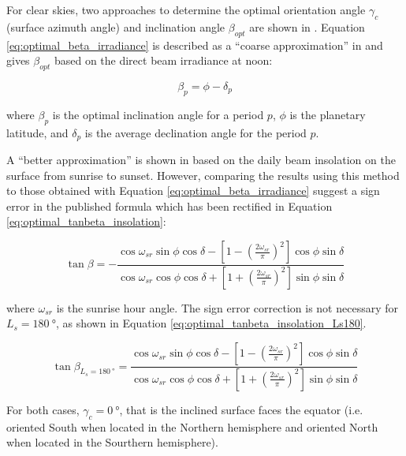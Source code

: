 For clear skies, two approaches to determine the optimal orientation angle $\gamma_{c}$ (surface azimuth angle) and inclination angle $\beta_{opt}$ are shown in . Equation \ref{eq:optimal_beta_irradiance} is described as a ``coarse approximation'' in  and gives $\beta_{opt}$ based on the direct beam irradiance at noon:

\begin{equation}
  \label{eq:optimal_beta_irradiance}
  \beta_{p} = \phi - \delta_{p}
\end{equation}

where $\beta_{p}$ is the optimal inclination angle for a period $p$, $\phi$ is the planetary latitude, and $\delta_{p}$ is the average declination angle for the period $p$.

A ``better approximation'' is shown in  based on the daily beam insolation on the surface from sunrise to sunset. However, comparing the results using this method to those obtained with Equation \ref{eq:optimal_beta_irradiance} suggest a sign error in the published formula which has been rectified in Equation  \ref{eq:optimal_tanbeta_insolation}:

\begin{equation}
  \label{eq:optimal_tanbeta_insolation}
  \tan{\beta} = -\frac{\cos{\omega_{sr}}\sin{\phi}\cos{\delta}-\left[1-\left(\frac{2\omega_{sr}}{\pi}\right)^{2}\right]\cos{\phi}\sin{\delta}}{\cos{\omega_{sr}}\cos{\phi}\cos{\delta}+\left[1+\left(\frac{2\omega_{sr}}{\pi}\right)^{2}\right]\sin{\phi}\sin{\delta}}
\end{equation}


where $\omega_{sr}$ is the sunrise hour angle. The sign error correction is not necessary for $L_{s} = \SI{180}{\degree}$, as shown in Equation \ref{eq:optimal_tanbeta_insolation_Ls180}.

\begin{equation}
  \label{eq:optimal_tanbeta_insolation_Ls180}
  \tan{\beta_{L_{s} = \SI{180}{\degree}}} = \frac{\cos{\omega_{sr}}\sin{\phi}\cos{\delta}-\left[1-\left(\frac{2\omega_{sr}}{\pi}\right)^{2}\right]\cos{\phi}\sin{\delta}}{\cos{\omega_{sr}}\cos{\phi}\cos{\delta}+\left[1+\left(\frac{2\omega_{sr}}{\pi}\right)^{2}\right]\sin{\phi}\sin{\delta}}
\end{equation}

For both cases, $\gamma_{c} = \SI{0}{\degree}$, that is the inclined surface faces the equator (i.e. oriented South when located in the Northern hemisphere and oriented North when located in the Sourthern hemisphere).




